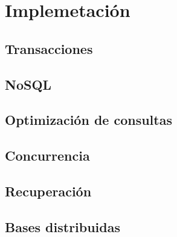 \chapter{Implemetación}

\section{Transacciones}

\section{NoSQL}

\section{Optimización de consultas}

\section{Concurrencia}

\section{Recuperación}

\section{Bases distribuidas}
